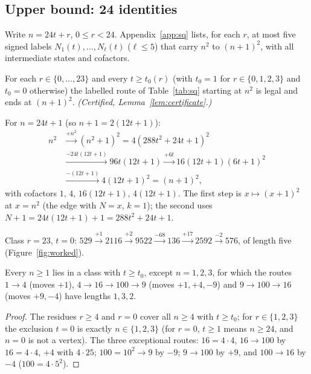 \subsection{Upper bound: 24 identities}
Write $n=24t+r$, $0\le r<24$. Appendix~\ref{app:sq} lists, for each $r$, at most five signed labels $N_1(t),\dots,N_\ell(t)$ ($\ell\le5$) that carry $n^2$ to $(n+1)^2$, with all intermediate states and cofactors.
\begin{proposition}\label{prop:sqid}
For each $r\in\{0,\dots,23\}$ and every $t\ge t_0(r)$ (with $t_0=1$ for $r\in\{0,1,2,3\}$ and $t_0=0$ otherwise) the labelled route of Table~\ref{tab:sq} starting at $n^2$ is legal and ends at $(n+1)^2$. \emph{(Certified, Lemma~\ref{lem:certificate}.)}
\end{proposition}
\begin{example}[Class $r=1$]\label{ex:sq1}
For $n=24t+1$ (so $n+1=2(12t+1)$):
\begin{align*}
n^2&\xrightarrow{+n^2}(n^2+1)^2=4(288t^2+24t+1)^2 \\
&\xrightarrow{-24t(12t+1)}96t(12t+1)
\xrightarrow{+6t}16(12t+1)(6t+1)^2\\
&\xrightarrow{-(12t+1)}4(12t+1)^2=(n+1)^2,
\end{align*}
with cofactors $1,\,4,\,16(12t+1),\,4(12t+1)$. The first step is $x\mapsto(x+1)^2$ at $x=n^2$ (the edge with $N=x$, $k=1$); the second uses $N+1=24t(12t+1)+1=288t^2+24t+1$.
\end{example}
\begin{example}[The sharp instance $n=23$]\label{ex:23}
Class $r=23$, $t=0$: $529\xrightarrow{+1}2116\xrightarrow{+2}9522\xrightarrow{-68}136\xrightarrow{+17}2592\xrightarrow{-2}576$, of length five (Figure~\ref{fig:worked}).
\end{example}
\begin{lemma}[Coverage]\label{lem:sqcover}
Every $n\ge1$ lies in a class with $t\ge t_0$, except $n=1,2,3$, for which the routes $1\to4$ (moves $+1$), $4\to16\to100\to9$ (moves $+1,+4,-9$) and $9\to100\to16$ (moves $+9,-4$) have lengths $1,3,2$.
\end{lemma}
\begin{proof} The residues $r\ge4$ and $r=0$ cover all $n\ge4$ with $t\ge t_0$; for $r\in\{1,2,3\}$ the exclusion $t=0$ is exactly $n\in\{1,2,3\}$ (for $r=0$, $t\ge1$ means $n\ge24$, and $n=0$ is not a vertex). The three exceptional routes: $16=4\cdot4$, $16\to100$ by $16=4\cdot4$, $+4$ with $4\cdot25$; $100=10^2\to9$ by $-9$; $9\to100$ by $+9$, and $100\to16$ by $-4$ ($100=4\cdot5^2$). \end{proof}


